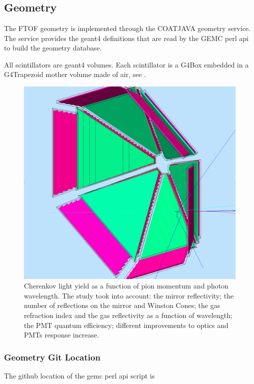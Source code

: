 \section{}


\subsection{Geometry}

The FTOF geometry is implemented through the COATJAVA geometry service.
The service provides the geant4 definitions that are read by the GEMC perl api to build the geometry database.

All scintillators are geant4 volumes.
Each scintillator is a G4Box embedded in a G4Trapezoid mother volume made of air, see .

\begin{figure}
	\centering
	\includegraphics[width=0.95\columnwidth,keepaspectratio]{img/ftofGeometry.png}
\caption{Cherenkov light yield as a function of pion momentum and photon wavelength. The study took into account: the mirror reflectivity; the number of reflections on the mirror and Winston Cones;
the gas refraction index and the gas reflectivity as a function of wavelength; the PMT quantum efficiency; different improvements to optics and PMTs response increase. }
	\label{fig:ftofGeometry}
\end{figure}


\subsubsection{Geometry Git Location}
The github location of the gemc perl api script is 

